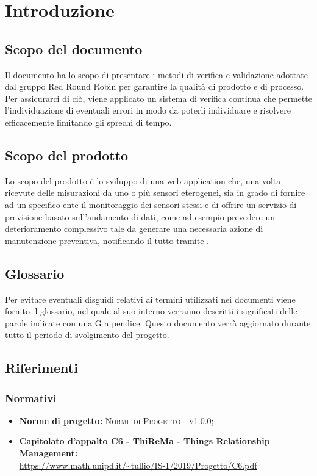 \section{Introduzione}
	\subsection{Scopo del documento}
		Il documento ha lo scopo di presentare i metodi di verifica e validazione adottate dal gruppo Red Round Robin per garantire la qualità di prodotto e di processo. Per assicurarci di ciò, viene applicato un sistema di verifica continua che permette l'individuazione di eventuali errori in modo da poterli individuare e risolvere efficacemente limitando gli sprechi di tempo.
	\subsection{Scopo del prodotto}
		Lo scopo del prodotto è lo sviluppo di una web-application che, una volta ricevute delle misurazioni da uno o più sensori eterogenei, sia in grado di fornire ad un specifico ente il monitoraggio dei sensori stessi e di offrire un servizio di previsione basato sull'andamento di dati, come ad esempio prevedere un deterioramento complessivo tale da generare una necessaria azione di manutenzione preventiva, notificando il tutto tramite .
	\subsection{Glossario}
		Per evitare eventuali disguidi relativi ai termini utilizzati nei documenti viene fornito il glossario, nel quale al suo interno verranno descritti i significati delle parole indicate con una G a pendice. Questo documento verrà aggiornato durante tutto il periodo di svolgimento del progetto.
	\subsection{Riferimenti}
		\subsubsection{Normativi}
		\begin{itemize}
			\item \textbf{Norme di progetto:} \textsc{Norme di Progetto - v1.0.0};
			\item \textbf{Capitolato d’appalto C6 - ThiReMa - Things Relationship Management:}\\
			\url{https://www.math.unipd.it/~tullio/IS-1/2019/Progetto/C6.pdf}
		\end{itemize}
